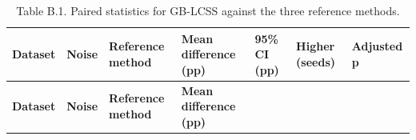 \begin{longtable}[]{@{}
  >{\raggedright\arraybackslash}p{}
  >{\centering\arraybackslash}p{}
  >{\centering\arraybackslash}p{}
  >{\centering\arraybackslash}p{}
  >{\centering\arraybackslash}p{}
  >{\centering\arraybackslash}p{}
  >{\centering\arraybackslash}p{}@{}}
\caption{Table B.1. Paired statistics for GB-LCSS against the three reference methods.}\tabularnewline
\toprule\noalign{}
\begin{minipage}[b]{\linewidth}\raggedright
\textbf{Dataset}
\end{minipage} & \begin{minipage}[b]{\linewidth}\centering
\textbf{Noise}
\end{minipage} & \begin{minipage}[b]{\linewidth}\centering
\textbf{Reference method}
\end{minipage} & \begin{minipage}[b]{\linewidth}\centering
\textbf{Mean difference (pp)}
\end{minipage} & \begin{minipage}[b]{\linewidth}\centering
\textbf{95\% CI (pp)}
\end{minipage} & \begin{minipage}[b]{\linewidth}\centering
\textbf{Higher (seeds)}
\end{minipage} & \begin{minipage}[b]{\linewidth}\centering
\textbf{Adjusted p}
\end{minipage} \\
\midrule\noalign{}
\endfirsthead
\toprule\noalign{}
\begin{minipage}[b]{\linewidth}\raggedright
\textbf{Dataset}
\end{minipage} & \begin{minipage}[b]{\linewidth}\centering
\textbf{Noise}
\end{minipage} & \begin{minipage}[b]{\linewidth}\centering
\textbf{Reference method}
\end{minipage} & \begin{minipage}[b]{\linewidth}\centering
\textbf{Mean difference (pp)}
\end{minipage} & \begin{minipage}[b]{\linewidth}\centering

\end{minipage}
\end{longtable}
